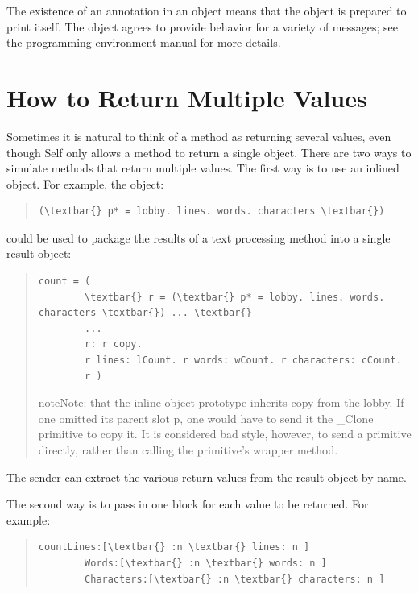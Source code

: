 \documentclass[letterpaper,10pt,english]{sphinxmanual}
\begin{document}
The existence of an  annotation in an object means that the object is prepared to print
itself. The object agrees to provide behavior for a variety of messages; see the programming environment
manual for more details.


\section{How to Return Multiple Values}
\label{progguid:how-to-return-multiple-values}
Sometimes it is natural to think of a method as returning several values, even though Self only
allows a method to return a single object. There are two ways to simulate methods that return
multiple values. The first way is to use an inlined object. For example, the object:
\begin{quote}

\begin{Verbatim}[commandchars=\\\{\}]
(\textbar{} p* = lobby. lines. words. characters \textbar{})
\end{Verbatim}
\end{quote}

could be used to package the results of a text processing method into a single result object:
\begin{quote}

\begin{Verbatim}[commandchars=\\\{\}]
count = (
        \textbar{} r = (\textbar{} p* = lobby. lines. words. characters \textbar{}) ... \textbar{}
        ...
        r: r copy.
        r lines: lCount. r words: wCount. r characters: cCount.
        r )
\end{Verbatim}

\begin{notice}{note}{Note:}
that the inline object prototype inherits copy from the lobby. If one omitted its parent slot p, one would have to
send it the \_Clone primitive to copy it. It is considered bad style, however, to send a primitive directly, rather than calling
the primitive’s wrapper method.
\end{notice}
\end{quote}

The sender can extract the various return values from the result object by name.

The second way is to pass in one block for each value to be returned. For example:
\begin{quote}

\begin{Verbatim}[commandchars=\\\{\}]
countLines:[\textbar{} :n \textbar{} lines: n ]
        Words:[\textbar{} :n \textbar{} words: n ]
        Characters:[\textbar{} :n \textbar{} characters: n ]
\end{Verbatim}
\end{quote}
\end{document}
